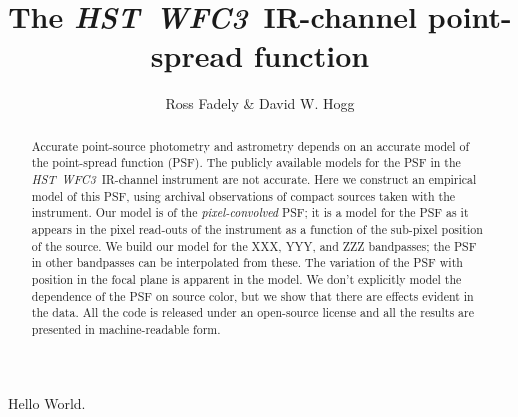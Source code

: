 \documentclass[12pt,letterpaper,preprint]{aastex}
\newcommand{\instrument}[1]{\textsl{#1}}
\newcommand{\HST}{\instrument{HST}}
\newcommand{\WFC}{\instrument{WFC3}}
\begin{document}
\title{The \HST\ \WFC\ IR-channel point-spread function}
\author{Ross Fadely \& David W. Hogg}

\begin{abstract}
Accurate point-source photometry and astrometry depends on an accurate model of the point-spread function (PSF).
The publicly available models for the PSF in the \HST\ \WFC\ IR-channel instrument are not accurate.
Here we construct an empirical model of this PSF,
  using archival observations of compact sources taken with the instrument.
Our model is of the \emph{pixel-convolved} PSF;
  it is a model for the PSF as it appears in the pixel read-outs of the instrument
  as a function of the sub-pixel position of the source.
We build our model for the XXX, YYY, and ZZZ bandpasses;
  the PSF in other bandpasses can be interpolated from these.
The variation of the PSF with position in the focal plane
  is apparent in the model.
We don't explicitly model the dependence of the PSF on source color,
  but we show that there are effects evident in the data.
All the code is released under an open-source license
  and all the results are presented in machine-readable form.
\end{abstract}


Hello World.
\end{document}
